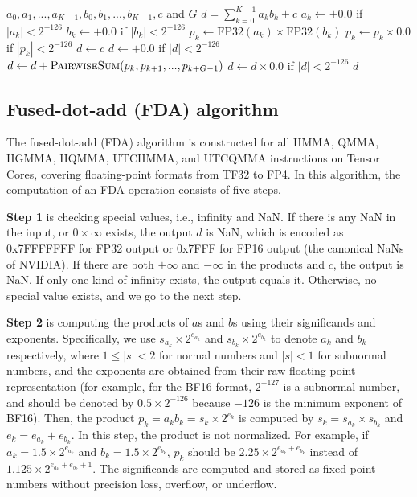 \begin{algorithm}
\small
\caption{Group-pairwise-sum (GPS) algorithm.}
\label{alg:gps}
\begin{algorithmic}
\Require $a_0, a_1, ..., a_{K-1}, b_0, b_1, ..., b_{K-1}, c$ and $G$
\Ensure $d = \sum_{k=0}^{K-1}a_{k}b_{k}+c$
    \State $a_k \gets +0.0$ if $|a_k|<2^{-126}$  
    \State $b_k \gets +0.0$ if $|b_k|<2^{-126}$
    \State $p_k \gets\mathrm{FP32}(a_k)\times\mathrm{FP32}(b_k)$
    \State $p_k\gets p_k\times 0.0$ if $|p_k|<2^{-126}$ 
\EndFor
\State $d \gets c$
\State $d\gets +0.0$ if $|d|<2^{-126}$ 
    \State $d\gets d+\textsc{PairwiseSum}(p_k, p_{k+1}, ..., p_{k+G-1})$
    \State $d\gets d\times 0.0$ if $|d|<2^{-126}$ 
\EndFor
\State \Return $d$
\end{algorithmic}
\end{algorithm}

\subsection{Fused-dot-add (FDA) algorithm}

The fused-dot-add (FDA) algorithm is constructed for all HMMA, QMMA, HGMMA, HQMMA, UTCHMMA, and UTCQMMA instructions on Tensor Cores, covering floating-point formats from TF32 to FP4. In this algorithm, the computation of an FDA operation consists of five steps.

\textbf{Step 1} is checking special values, i.e., infinity and NaN. If there is any NaN in the input, or $0\times \infty$ exists, the output $d$ is NaN, which is encoded as 0x7FFFFFFF for FP32 output or 0x7FFF for FP16 output (the canonical NaNs of NVIDIA). If there are both $+\infty$ and $-\infty$ in the products and $c$, the output is NaN. If only one kind of infinity exists, the output equals it. Otherwise, no special value exists, and we go to the next step.

\textbf{Step 2} is computing the products of $a$s and $b$s using their significands and exponents. Specifically, we use $s_{a_k}\times 2^{e_{a_k}}$ and $s_{b_k}\times 2^{e_{b_k}}$ to denote $a_k$ and $b_k$ respectively, where $1\le |s|<2$ for normal numbers and $|s|<1$ for subnormal numbers, and the exponents are obtained from their raw floating-point representation (for example, for the BF16 format, $2^{-127}$ is a subnormal number, and should be denoted by $0.5 \times 2^{-126}$ because $-126$ is the minimum exponent of BF16). Then, the product $p_k=a_kb_k=s_k\times 2^{e_k}$ is computed by $s_k=s_{a_k}\times s_{b_k}$ and $e_k=e_{a_k}+e_{b_k}$. In this step, the product is not normalized. For example, if $a_k=1.5\times 2^{e_{a_k}}$ and $b_k=1.5\times 2^{e_{b_k}}$, $p_k$ should be $2.25\times 2^{e_{a_k}+e_{b_k}}$ instead of $1.125\times 2^{e_{a_k}+e_{b_k}+1}$. The significands are computed and stored as fixed-point numbers without precision loss, overflow, or underflow.

